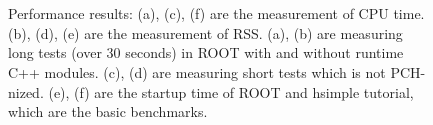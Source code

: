 \documentclass{webofc}
\begin{document}
\begin{figure}
    \begin{minipage}{.48\textwidth}
 　 \end{minipage}\hfill
    \begin{minipage}{.48\textwidth}
 　 \end{minipage}
\caption{Performance results: (a), (c), (f) are the measurement of CPU time. (b), (d), (e) are the measurement of RSS. (a), (b) are measuring long tests (over 30 seconds) in ROOT with and without runtime C++ modules. (c), (d) are measuring short tests which is not PCH-nized. (e), (f) are the startup time of ROOT and hsimple tutorial, which are the basic benchmarks.}
\label{fig:performance}
\end{figure}
\end{document}
